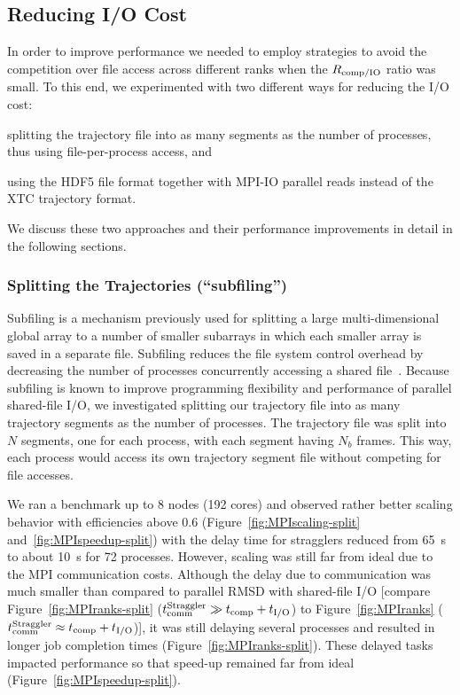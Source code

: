 \subsection{Reducing I/O Cost}
\label{sec:I/O}
In order to improve performance we needed to employ strategies to avoid the competition over file access across different ranks when the $R_{\text{comp/IO}}$ ratio was small.
To this end, we experimented with two different ways for reducing the I/O cost:
\begin{inparaenum}[1)]
	\item splitting the trajectory file into as many segments as the number of processes, thus using file-per-process access, and
	\item using the HDF5 file format together with MPI-IO parallel reads instead of the XTC trajectory format.
\end{inparaenum}
We discuss these two approaches and their performance improvements in detail in the following sections.

\subsubsection{Splitting the Trajectories (``subfiling'')}
\label{splitting-traj}
Subfiling is a mechanism previously used for splitting a large multi-dimensional global array to a number of smaller subarrays in which each smaller array is saved in a separate file. Subfiling reduces the file system control overhead by decreasing the number of processes concurrently accessing a shared file~\cite{scalable-IO, scalable-IO1}.
Because subfiling is known to improve programming flexibility and performance of parallel shared-file I/O, we investigated splitting our trajectory file into as many trajectory segments as the number of processes.
The trajectory file was split into $N$ segments, one for each process, with each segment having $N_{b}$ frames. 
This way, each process would access its own trajectory segment file without competing for file accesses. 

We ran a benchmark up to 8 nodes (192 cores) and observed rather better scaling behavior with efficiencies above 0.6 (Figure~\ref{fig:MPIscaling-split} and~\ref{fig:MPIspeedup-split}) with the delay time for stragglers reduced from 65~s to about 10~s for 72 processes. 
However, scaling was still far from ideal due to the MPI communication costs. 
Although the delay due to communication was much smaller than compared to parallel RMSD with shared-file I/O [compare Figure~\ref{fig:MPIranks-split} ($t_{\text{comm}}^{\text{Straggler}} \gg {t}_{\text{comp}}+{t}_{\text{I/O}}$) to Figure~\ref{fig:MPIranks} ($t_{\text{comm}}^{\text{Straggler}} \approx {t}_{\text{comp}}+{t}_{\text{I/O}}$)], it was still delaying several processes and resulted in longer job completion times (Figure~\ref{fig:MPIranks-split}). 
These delayed tasks impacted performance so that speed-up remained far from ideal (Figure~\ref{fig:MPIspeedup-split}).


